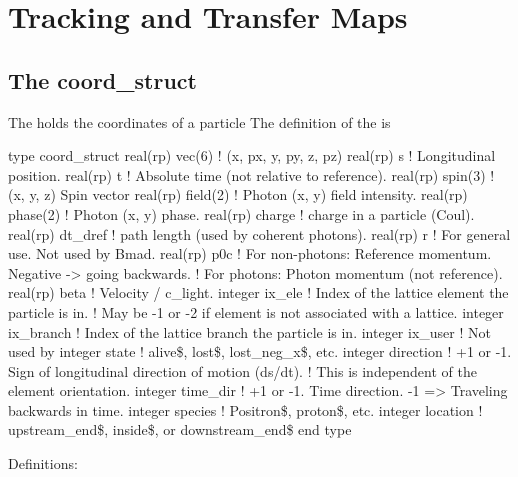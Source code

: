 \chapter{Tracking and Transfer Maps}
\label{c:tracking}

\section{The coord_struct}
\label{s:coord.struct}

The  holds the coordinates of a particle The definition of the  is
\begin{example}
  type coord_struct
    real(rp) vec(6)     ! (x, px, y, py, z, pz)
    real(rp) s          ! Longitudinal position.
    real(rp) t          ! Absolute time (not relative to reference).
    real(rp) spin(3)    ! (x, y, z) Spin vector
    real(rp) field(2)   ! Photon (x, y) field intensity.
    real(rp) phase(2)   ! Photon (x, y) phase.
    real(rp) charge     ! charge in a particle (Coul).
    real(rp) dt_dref    ! path length (used by coherent photons).
    real(rp) r          ! For general use. Not used by Bmad.
    real(rp) p0c        ! For non-photons: Reference momentum. Negative -> going backwards.
                        !     For photons: Photon momentum (not reference).
    real(rp) beta       ! Velocity / c_light. 
    integer ix_ele      ! Index of the lattice element the particle is in.
                        !   May be -1 or -2 if element is not associated with a lattice.
    integer ix_branch   ! Index of the lattice branch the particle is in.
    integer ix_user     ! Not used by \bmad
    integer state       ! alive\$, lost\$, lost_neg_x\$, etc.
    integer direction   ! +1 or -1. Sign of longitudinal direction of motion (ds/dt).
                        !  This is independent of the element orientation.
    integer time_dir    ! +1 or -1. Time direction. -1 => Traveling backwards in time.
    integer species     ! Positron\$, proton\$, etc.
    integer location    ! upstream_end\$, inside\$, or downstream_end\$
end type
\end{example}
Definitions:
